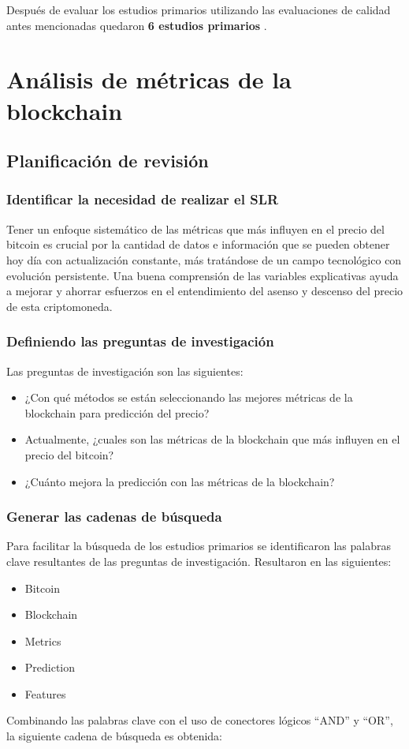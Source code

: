 Después de evaluar los estudios primarios utilizando las evaluaciones de calidad antes mencionadas quedaron \textbf{6 estudios primarios} \parencite{tandonBitcoinPriceForecasting2019,chenBitcoinPricePrediction2020,mudassirTimeseriesForecastingBitcoin2020,felizardoComparativeStudyBitcoin2019,mcnallyPredictingPriceBitcoin2018,phaladisailoedMachineLearningModels2018}.

\section{Análisis de métricas de la blockchain}
\subsection{Planificación de revisión}
\subsubsection{Identificar la necesidad de realizar el SLR}

Tener un enfoque sistemático de las métricas que más influyen en el precio del bitcoin es crucial por la cantidad de datos e información que se pueden obtener hoy día con actualización constante, más tratándose de un campo tecnológico con evolución persistente.
Una buena comprensión de las variables explicativas ayuda a mejorar y ahorrar esfuerzos en el entendimiento del asenso y descenso del precio de esta criptomoneda.

\subsubsection{Definiendo las preguntas de investigación}
Las preguntas de investigación son las siguientes:
\begin{itemize}
	\item ¿Con qué métodos se están seleccionando las mejores métricas de la blockchain para predicción del precio?
	\item Actualmente, ¿cuales son las métricas de la blockchain que más influyen en el precio del bitcoin?
	\item ¿Cuánto mejora la predicción con las métricas de la blockchain?
\end{itemize}

\subsubsection{Generar las cadenas de búsqueda}
Para facilitar la búsqueda de los estudios primarios se identificaron las palabras clave resultantes de las preguntas de investigación. Resultaron en las siguientes:
\begin{itemize}
	\item Bitcoin
	\item Blockchain
	\item Metrics
	\item Prediction
	\item Features
\end{itemize}
Combinando las palabras clave con el uso de conectores lógicos “AND” y “OR”, la siguiente cadena de búsqueda es obtenida:\\


